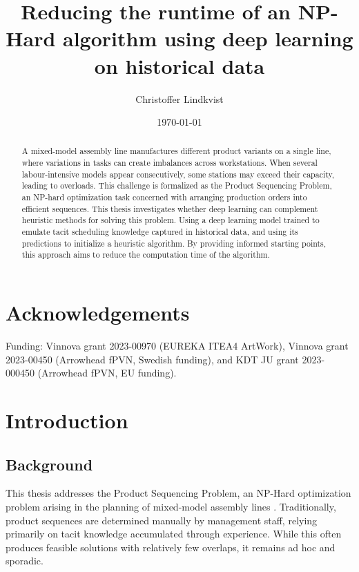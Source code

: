 \documentclass[12pt,a4paper]{report}
\begin{document}
\title{Reducing the runtime of an NP-Hard algorithm using deep learning on historical data}
\author{Christoffer Lindkvist}
\date{\today}
\maketitle

\begin{abstract} 
    A mixed-model assembly line manufactures different product variants on a single line, where variations in tasks can create imbalances across workstations. When several labour-intensive models appear consecutively, some stations may exceed their capacity, leading to overloads. This challenge is formalized as the Product Sequencing Problem, an NP-hard optimization task concerned with arranging production orders into efficient sequences. This thesis investigates whether deep learning can complement heuristic methods for solving this problem. Using a deep learning model trained to emulate tacit scheduling knowledge captured in historical data, and using its predictions to initialize a heuristic algorithm. By providing informed starting points, this approach aims to reduce the computation time of the algorithm.
\end{abstract}

\chapter*{Acknowledgements} %
Funding: Vinnova grant 2023-00970 (EUREKA ITEA4 ArtWork), Vinnova grant 2023-00450 (Arrowhead fPVN, Swedish
funding), and KDT JU grant 2023-000450 (Arrowhead fPVN,
EU funding).


\tableofcontents

\chapter{Introduction}
\section{Background}
This thesis addresses the Product Sequencing Problem, an NP-Hard optimization problem arising in the planning of mixed-model assembly lines \cite{ref6}. Traditionally, product sequences are determined manually by management staff, relying primarily on tacit knowledge accumulated through experience. While this often produces feasible solutions with relatively few overlaps, it remains ad hoc and sporadic. %
\end{document}
